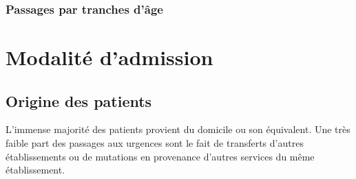 \documentclass[12pt,english,french,twoside]{report}\usepackage[]{graphicx}\usepackage[]{color}
\begin{document}
\subsection*{Passages par tranches d'âge}

\chapter{Modalité d'admission}



\section*{Origine des patients}

L'immense majorité des patients provient du domicile ou son équivalent. Une très faible part des passages aux urgences sont le fait de transferts d'autres établissements ou de mutations en provenance d'autres services du même établissement.
\end{document}
